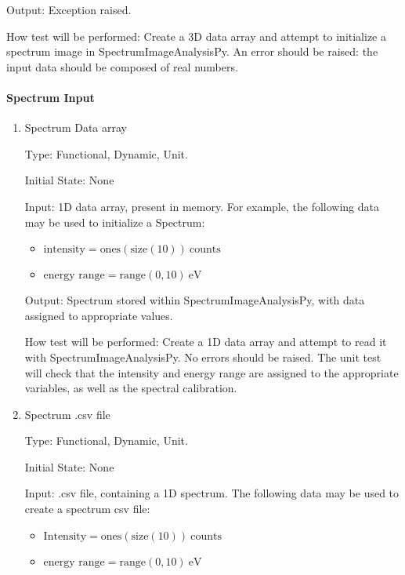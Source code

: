 \documentclass[12pt, titlepage]{article}
\newcommand{\progname}{SpectrumImageAnalysisPy}
\begin{document}
\begin{enumerate}
Output: Exception raised.

How test will be performed: Create a 3D data array and attempt to initialize a
spectrum image in \progname{}. An error should be raised: the input data should
be composed of real numbers.

\end{enumerate}

\paragraph{Spectrum Input}

\begin{enumerate}

\item{Spectrum Data array}

Type: Functional, Dynamic, Unit.
					
Initial State: None
					
Input: 1D data array, present in memory. For example, the following data may be
used to initialize a Spectrum:
\begin{itemize}
	\item $\text{intensity} = \text{ones}(\text{size}(10))\ \text{counts}$
	\item $\text{energy range} = \text{range}(0, 10)\ \si{\electronvolt}$
\end{itemize}

Output: Spectrum stored within \progname{}, with data assigned to appropriate
values.
					
How test will be performed: Create a 1D data array and attempt to read it with
\progname{}. No errors should be raised. The unit test will check that the
intensity and energy range are assigned to the appropriate variables, as well as
the spectral calibration.


\item{Spectrum .csv file}

Type: Functional, Dynamic, Unit.

Initial State: None

Input: .csv file, containing a 1D spectrum. The following data may be used to
create a spectrum csv file:
\begin{itemize}
	\item $\text{Intensity} = \text{ones}(\text{size}(10))\ \text{counts}$
	\item $\text{energy range} = \text{range}(0, 10)\ \si{\electronvolt}$
\end{itemize}


\end{enumerate}
\end{document}
